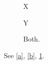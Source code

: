 \documentclass{article}
\begin{document}
\begin{figure}
\begin{minipage}[b]{.4\linewidth}X\label{a}\end{minipage}%
\begin{minipage}[b]{.4\linewidth}Y\label{b}\end{minipage}
\caption{Both.}\label{f}
\end{figure}
See \ref{a}, \ref{b}, \ref{f}.
\end{document}
